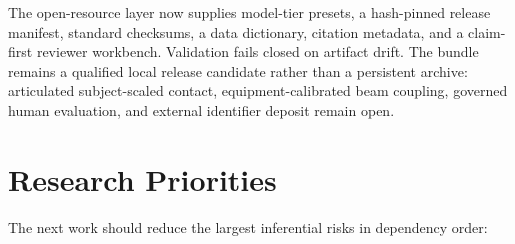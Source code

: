 \documentclass[
  letterpaper,
]{report}
\begin{document}
The open-resource layer now supplies model-tier presets, a hash-pinned
release manifest, standard checksums, a data dictionary, citation
metadata, and a claim-first reviewer workbench. Validation fails closed
on artifact drift. The bundle remains a qualified local release
candidate rather than a persistent archive: articulated subject-scaled
contact, equipment-calibrated beam coupling, governed human evaluation,
and external identifier deposit remain open.

\section{Research Priorities}\label{sec-future}

The next work should reduce the largest inferential risks in dependency
order:
\end{document}
